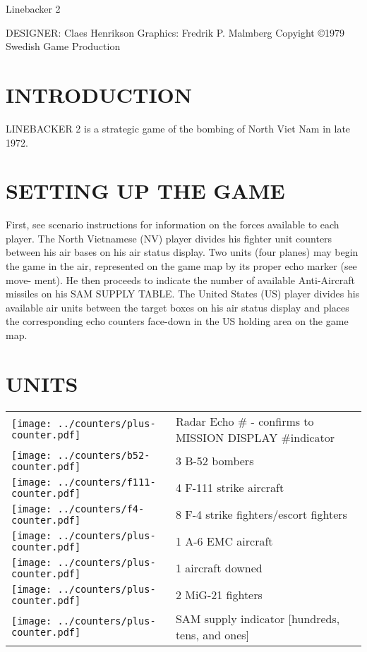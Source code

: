Linebacker 2

DESIGNER: Claes Henrikson
Graphics: Fredrik P. Malmberg
Copyight ©1979
Swedish Game Production

\section*{INTRODUCTION}
LINEBACKER 2 is a strategic game 
of the bombing of North Viet Nam in 
late 1972.

\section*{SETTING UP THE GAME}
First, see scenario instructions for 
information on the forces available 
to each player. The North Vietnamese 
(NV) player divides his fighter unit 
counters between his air bases on his 
air status display. Two units (four 
planes) may begin the game in the 
air, represented on the game map by 
its proper echo marker (see move- 
ment). He then proceeds to indicate 
the number of available Anti-Aircraft 
missiles on his SAM SUPPLY TABLE. 
The United States (US) player 
divides his available air units between 
the target boxes on his air status 
display and places the corresponding 
echo counters face-down in the US 
holding area on the game map.

\newcommand{\bfiftytwo}{\texttt{[image: ../counters/b52-counter.pdf]}}
\newcommand{\ffour}{\texttt{[image: ../counters/f4-counter.pdf]}}
\newcommand{\foneeleven}{\texttt{[image: ../counters/f111-counter.pdf]}}
\newcommand{\plus}{\texttt{[image: ../counters/plus-counter.pdf]}}
\newcommand{\graphic}{\texttt{[image: ../counters/plus-counter.pdf]}}

\section*{UNITS}
\noindent
\begin{tabularx}{\linewidth}{@{} m{0.3in} X @{}}
   \graphic & Radar Echo \# - confirms to MISSION DISPLAY \#indicator \\ 
   \bfiftytwo & 3 B-52 bombers \\
   \foneeleven & 4 F-111 strike aircraft \\
   \ffour & 8 F-4 strike fighters/escort fighters \\
   \plus & 1 A-6 EMC aircraft \\
   \graphic & 1 aircraft downed \\
   \graphic & 2 MiG-21 fighters \\
   \graphic & SAM supply indicator [hundreds, tens, and ones] \\
 \end{tabularx}
 


